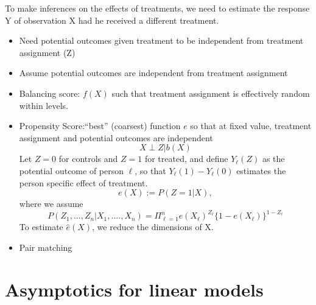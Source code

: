 \documentclass[12pt]{article}\usepackage{graphicx, color}
\theoremstyle{definition}
\renewcommand{\hat}{\widehat}
\begin{document}
To make inferences on the effects of treatments, we need to estimate the response Y of observation X had he received a different treatment.
\begin{itemize}
\item Need potential outcomes given treatment to be independent from treatment assignment (Z)
\item Assume potential outcomes are independent from treatment assignment 
\item Balancing score: $f(X)$ such that treatment assignment is effectively random within levels.
\item Propensity Score:``best'' (coarsest) function $e$ so that at fixed value, treatment assignment and potential outcomes are independent 
$$X\perp Z | b(X)$$
Let $Z=0$ for controls and $Z=1$ for treated, and define $Y_\ell(Z)$ as the potential outcome of person $\ell$, so that $Y_\ell(1)-Y_\ell(0)$ estimates the person specific effect of treatment. 
$$e(X):=P(Z=1|X),$$ where we assume
$$P(Z_1,...,Z_n|X_1,....,X_n)=\Pi_{\ell=1}^ne(X_\ell)^{Z_\ell}\{1-e(X_\ell)\}^{1-Z_\ell}$$
To estimate $\hat e(X)$, we reduce the dimensions of X. 
\item Pair matching 
\end{itemize}
\section{Asymptotics for linear models}
\end{document}
